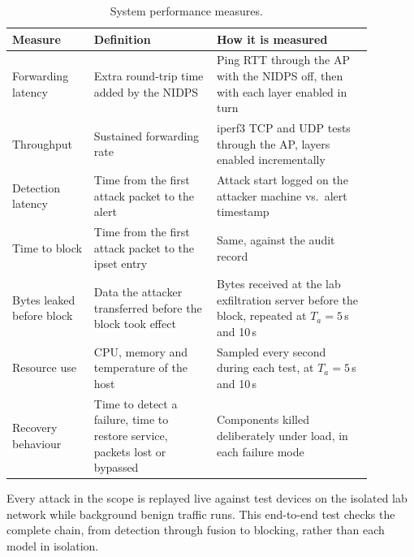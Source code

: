 \begin{table}[H]
\centering
\caption{System performance measures.}
\label{tab:sysperf}
\begin{tabular}{|>{\raggedright\arraybackslash}p{0.2\linewidth}|>{\raggedright\arraybackslash}p{0.3\linewidth}|>{\raggedright\arraybackslash}p{0.38\linewidth}|}
\hline
\textbf{Measure} & \textbf{Definition} & \textbf{How it is measured} \\
\hline
Forwarding latency & Extra round-trip time added by the NIDPS & Ping RTT through the AP with the NIDPS off, then with each layer enabled in turn \\
\hline
Throughput & Sustained forwarding rate & iperf3 TCP and UDP tests through the AP, layers enabled incrementally \\
\hline
Detection latency & Time from the first attack packet to the alert & Attack start logged on the attacker machine vs.\ alert timestamp \\
\hline
Time to block & Time from the first attack packet to the ipset entry & Same, against the audit record \\
\hline
Bytes leaked before block & Data the attacker transferred before the block took effect & Bytes received at the lab exfiltration server before the block, repeated at $T_a = 5$\,s and 10\,s \\
\hline
Resource use & CPU, memory and temperature of the host & Sampled every second during each test, at $T_a = 5$\,s and 10\,s \\
\hline
Recovery behaviour & Time to detect a failure, time to restore service, packets lost or bypassed & Components killed deliberately under load, in each failure mode \\
\hline
\end{tabular}
\end{table}

\noindent Every attack in the scope is replayed live against test devices on the isolated lab network while background benign traffic runs. This end-to-end test checks the complete chain, from detection through fusion to blocking, rather than each model in isolation.

